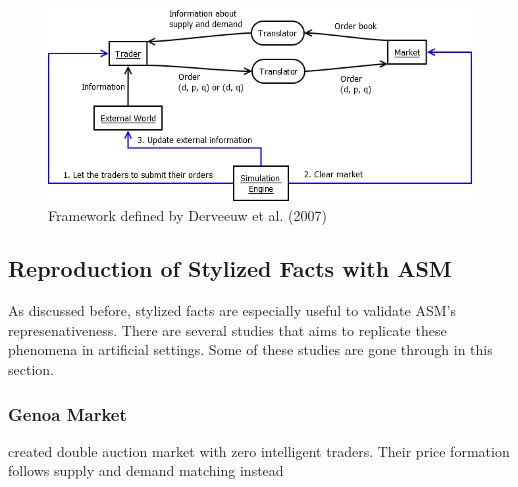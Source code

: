 \begin{figure}
    \includegraphics[width=\linewidth]{diagrams/julien_market.png}
    \caption{Framework defined by Derveeuw et al. (2007)}
\end{figure}


\subsection{Reproduction of Stylized Facts with ASM}
As discussed before, stylized facts are especially useful
to validate ASM's represenativeness. There are several 
studies that aims to replicate these phenomena in 
artificial settings. Some of these studies are
gone through in this section.
% 
\subsubsection{Genoa Market}

\citet{Genoa01} created double auction market with zero
intelligent traders. Their price formation follows supply and 
demand matching instead 